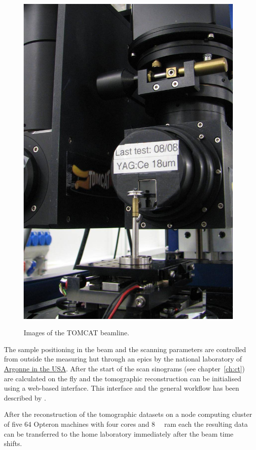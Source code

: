 \begin{figure}[p]
{		\includegraphics[width=\imsize]{img/TOMCAT2}%
		\label{subfig:TOMCAT2}%
		}%
	\caption{Images of the TOMCAT beamline.}
\end{figure}

The sample positioning in the beam and the scanning parameters are controlled from outside the measuring hut through an \ac{epics} by the national laboratory of \href{http://www.aps.anl.gov/epics/}{Argonne in the USA}. After the start of the scan sinograms (see chapter~\ref{ch:ct}) are calculated on the fly and the tomographic reconstruction can be initialised using a web-based interface. This interface and the general workflow has been described by \citet{Hintermueller2010}.

After the reconstruction of the tomographic datasets on a node computing cluster of five \SI{64}{\bit} Opteron machines with four cores and \SI{8}{\giga\byte} \acs{ram} each the resulting data can be transferred to the home laboratory immediately after the beam time shifts.